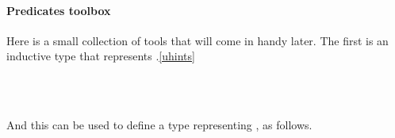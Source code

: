 \paragraph*{Predicates toolbox}
Here is a small collection of tools that will come in handy later. The first is an inductive type that represents .\cref{uhints}
\ccpad
\begin{code}
\>[0]\AgdaSpace{}%
\AgdaSpace{}%
\AgdaSymbol{(}\AgdaSpace{}%
\AgdaSymbol{:}\AgdaSpace{}%
\AgdaSpace{}%
\AgdaSymbol{)}\AgdaSpace{}%
\AgdaSymbol{(}\AgdaSpace{}%
\AgdaSymbol{:}\AgdaSpace{}%
\AgdaSpace{}%
\AgdaSymbol{)}\AgdaSpace{}%
\AgdaSymbol{:}\AgdaSpace{}%
\AgdaSpace{}%
\AgdaSpace{}%
\AgdaSpace{}%
\AgdaSpace{}%
\<%
\\
\>[0][@{}l@{\AgdaIndent{0}}]%
\>[1]\AgdaSpace{}%
\AgdaSymbol{:}\AgdaSpace{}%
\AgdaSymbol{(}\AgdaSpace{}%
\AgdaSymbol{:}\AgdaSpace{}%
\AgdaSymbol{)}\AgdaSpace{}%
\AgdaSpace{}%
\AgdaSpace{}%
\AgdaSpace{}%
\<%
\\
%
\>[1]\AgdaSpace{}%
\AgdaSymbol{:}\AgdaSpace{}%
\AgdaSymbol{(}\AgdaSpace{}%
\AgdaSymbol{:}\AgdaSpace{}%
\AgdaSymbol{)}\AgdaSpace{}%
\AgdaSpace{}%
\AgdaSpace{}%
\AgdaSpace{}%
\<%
\end{code}
\ccpad
And this can be used to define a type representing , as follows.
\ccpad
